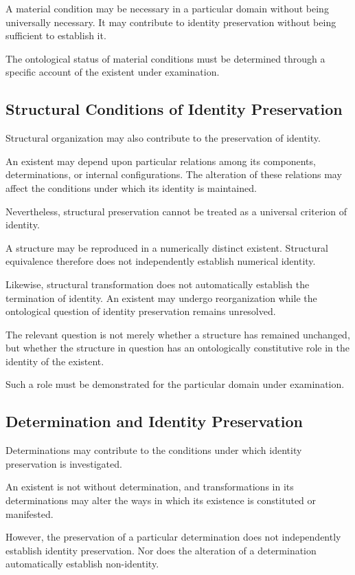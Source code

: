 A material condition may be necessary in a particular
domain without being universally necessary. It
may contribute to identity preservation without
being sufficient to establish it.

The ontological status of material conditions must
be determined through a specific account of the
existent under examination.

\subsection{Structural Conditions of Identity Preservation}

Structural organization may also contribute to
the preservation of identity.

An existent may depend upon particular relations
among its components, determinations, or internal
configurations. The alteration of these relations
may affect the conditions under which its identity
is maintained.

Nevertheless, structural preservation cannot
be treated as a universal criterion of identity.

A structure may be reproduced in a numerically
distinct existent. Structural equivalence therefore
does not independently establish numerical identity.

Likewise, structural transformation does not
automatically establish the termination of identity.
An existent may undergo reorganization while the
ontological question of identity preservation
remains unresolved.

The relevant question is not merely whether a
structure has remained unchanged, but whether
the structure in question has an ontologically
constitutive role in the identity of the existent.

Such a role must be demonstrated for the particular
domain under examination.

\subsection{Determination and Identity Preservation}

Determinations may contribute to the conditions
under which identity preservation is investigated.

An existent is not without determination, and
transformations in its determinations may alter
the ways in which its existence is constituted
or manifested.

However, the preservation of a particular determination
does not independently establish identity preservation.
Nor does the alteration of a determination automatically
establish non-identity.

